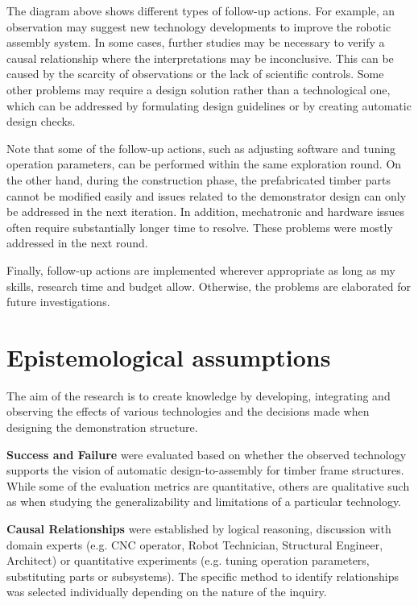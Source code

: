 The diagram above shows different types of follow-up actions. For example, an observation may suggest new technology developments to improve the robotic assembly system. In some cases, further studies may be necessary to verify a causal relationship where the interpretations may be inconclusive. This can be caused by the scarcity of observations or the lack of scientific controls. Some other problems may require a design solution rather than a technological one, which can be addressed by formulating design guidelines or by creating automatic design checks. 

Note that some of the follow-up actions, such as adjusting software and tuning operation parameters, can be performed within the same exploration round. On the other hand, during the construction phase, the prefabricated timber parts cannot be modified easily and issues related to the demonstrator design can only be addressed in the next iteration. In addition, mechatronic and hardware issues often require substantially longer time to resolve. These problems were mostly addressed in the next round. 

Finally, follow-up actions are implemented wherever appropriate as long as my skills, research time and budget allow. Otherwise, the problems are elaborated for future investigations. 

\section{Epistemological assumptions}
\label{section:methodology_epistemological_assumptions}

The aim of the research is to create knowledge by developing, integrating and observing the effects of various technologies and the decisions made when designing the demonstration structure.

\textbf{Success and Failure} were evaluated based on whether the observed technology supports the vision of automatic design-to-assembly for timber frame structures. While some of the evaluation metrics are quantitative, others are qualitative such as when studying the generalizability and limitations of a particular technology.

\textbf{Causal Relationships} were established by logical reasoning, discussion with domain experts (e.g. CNC operator, Robot Technician, Structural Engineer, Architect) or quantitative experiments (e.g. tuning operation parameters, substituting parts or subsystems). The specific method to identify relationships was selected individually depending on the nature of the inquiry.

